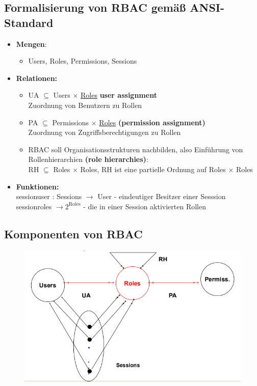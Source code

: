 \documentclass[openany]{book}
\begin{document}
\subsection{Formalisierung von RBAC gemäß ANSI-Standard}

\begin{itemize}
    \item \textbf{Mengen}:
    \begin{itemize}
        \item Users, Roles, Permissions, Sessions
    \end{itemize}
    \item \textbf{Relationen:}
    \begin{itemize}
        \item UA $\subseteq$ Users $\times$ \underline{Roles} \textbf{user assignment} \\ Zuordnung von Benutzern zu Rollen
        \item PA $\subseteq$ Permissions $\times$ \underline{Roles} \textbf{(permission assignment)} \\ Zuordnung von Zugriffsberechtigungen zu Rollen
        \item RBAC soll Organisationsstrukturen nachbilden, also Einführung von Rollenhierarchien \textbf{(role hierarchies)}: \\ RH $\subseteq$ Roles $\times$ Roles, RH ist eine partielle Ordnung auf Roles $\times$ Roles
    \end{itemize}
    \item \textbf{Funktionen:} \\ session\textunderscore user : Sessions $\rightarrow$ User - eindeutiger Besitzer einer Sesssion \\ session\textunderscore roles $\rightarrow 2^\text{Roles}$ - die in einer Session aktivierten Rollen
\end{itemize}

\newpage

\subsection{Komponenten von RBAC}

\begin{figure}[h!]
    \centering
    \includegraphics[width=0.85\linewidth]{Pics/RBAC.PNG}
\end{figure}
\end{document}
